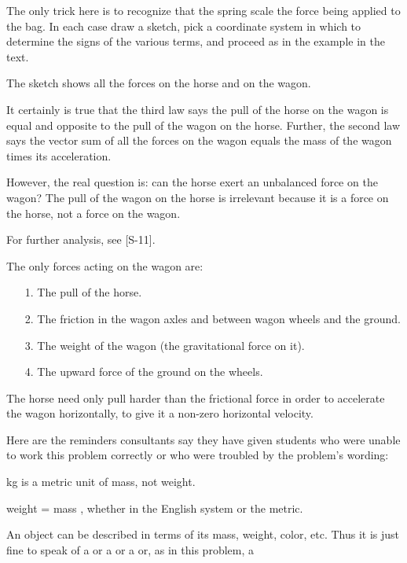 {
{The only trick here is to recognize that the spring scale  the force
 being applied to the bag.
 In each case draw a sketch, pick a coordinate system in which to determine
 the signs of the various terms, and proceed as in the example in the text.
}

{\noindent{}

 The sketch shows all the forces on the horse and on the wagon.

 It certainly is true that the third law says the pull of the horse on the
 wagon is equal and opposite to the pull of the wagon on the horse.
 Further, the second law says the vector sum of all the forces on the wagon
 equals the mass of the wagon times its acceleration.

 However, the real question is: can the horse exert an unbalanced force on
 the wagon?
 The pull of the wagon on the horse is irrelevant because it is a force on the
 horse, not a force on the wagon.

 For further analysis, see [S-11].
}

{ The only forces acting on the wagon are:
 \begin{itemize}
 \item [1.] The pull of the horse.
 \item [2.] The friction in the wagon axles and between wagon wheels and the
 ground.
 \item [3.] The weight of the wagon (the gravitational force on it).
 \item [4.] The upward force of the ground on the wheels.
 \end{itemize}
 The horse need only pull harder than the frictional force in order to
 accelerate the wagon horizontally, to give it a non-zero horizontal velocity.
}

{Here are the reminders consultants say they have given students who
 were unable to work this problem correctly or who were troubled by the problem's
 wording:
 
 \begin{one-digit-list}
 \item [\m{\bullet}] kg is a metric unit of mass, not weight.

 \item [\m{\bullet}] weight = mass \m{\times} , whether in the English system or the metric.

 \item [\m{\bullet}] An object can be described in terms of its mass, weight, color, etc.
 Thus it is just fine to speak of a  or a  or a  or, as in this problem, a 
 \end{one-digit-list}
}

}
